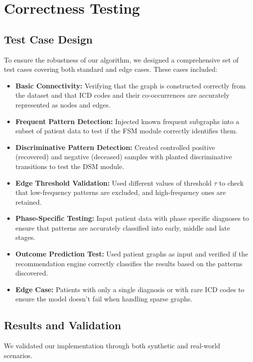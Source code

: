 \documentclass[10pt]{article}
\begin{document}
\section{Correctness Testing}
\subsection*{Test Case Design}
To ensure the robustness of our algorithm, we designed a comprehensive set of test cases covering both standard and edge cases. These cases included:

\begin{itemize}[noitemsep]
    \item \textbf{Basic Connectivity:} Verifying that the graph is constructed correctly from the dataset and that ICD codes and their co-occurrences are accurately represented as nodes and edges.
    \item \textbf{Frequent Pattern Detection:} Injected known frequent subgraphs into a subset of patient data to test if the FSM module correctly identifies them.
    \item \textbf{Discriminative Pattern Detection:} Created controlled positive (recovered) and negative (deceased) samples with planted discriminative transitions to test the DSM module.
    \item \textbf{Edge Threshold Validation:} Used different values of threshold $\tau$ to check that low-frequency patterns are excluded, and high-frequency ones are retained.
    \item \textbf{Phase-Specific Testing:} Input patient data with phase specific diagnoses to ensure that patterns are accurately classified into early, middle and late stages.
    \item \textbf{Outcome Prediction Test:} Used patient graphs as input and verified if the recommendation engine correctly classifies the results based on the patterns discovered.
    \item \textbf{Edge Case:} Patients with only a single diagnosis or with rare ICD codes to ensure the model doesn’t fail when handling sparse graphs.
\end{itemize}

\subsection*{Results and Validation}

We validated our implementation through both synthetic and real-world scenarios.
\end{document}
